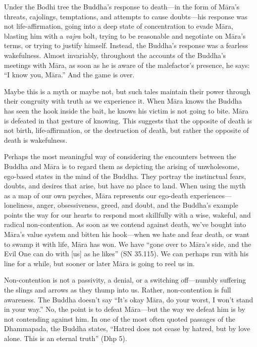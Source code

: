 
Under the Bodhi tree the Buddha's response to death---in the form of 
Māra's threats, cajolings, temptations, and attempts to cause 
doubts---his response was not life-affirmation, going into a deep state 
of concentration to evade Māra, blasting him with a \emph{vajra} bolt, 
trying to be reasonable and negotiate on Māra's terms, or trying to 
justify himself. Instead, the Buddha's response was a fearless 
wakefulness. Almost invariably, throughout the accounts of the Buddha's 
meetings with Māra, as soon as he is aware of the malefactor's 
presence, he says: ``I know you, Māra.'' And the game is over.

Maybe this is a myth or maybe not, but such tales maintain their power 
through their congruity with truth as we experience it. When Māra 
knows the Buddha has seen the hook inside the bait, he knows his victim 
is not going to bite. Māra is defeated in that gesture of knowing. 
This suggests that the opposite of death is not birth, 
life-affirmation, or the destruction of death, but rather the opposite 
of death is wakefulness.

Perhaps the most meaningful way of considering the encounters between 
the Buddha and Māra is to regard them as depicting the arising of 
unwholesome, ego-based states in the mind of the Buddha. They portray 
the instinctual fears, doubts, and desires that arise, but have no 
place to land. When using the myth as a map of our own psyches, Māra 
represents our ego-death experiences---loneliness, anger, 
obsessiveness, greed, and doubt, and the Buddha's example points the 
way for our hearts to respond most skillfully with a wise, wakeful, and 
radical non-contention. As soon as we contend against death, we've 
bought into Māra's value system and bitten his hook---when we hate and 
fear death, or want to swamp it with life, Māra has won. We have 
``gone over to Māra's side, and the Evil One can do with [us] as he 
likes'' (SN 35.115). We can perhaps run with his line for a while, but 
sooner or later Māra is going to reel us in.

Non-contention is not a passivity, a denial, or a switching 
off---numbly suffering the slings and arrows as they thump into us. 
Rather, non-contention is full awareness. The Buddha doesn't say ``It's 
okay Māra, do your worst, I won't stand in your way.'' No, the point 
is to defeat Māra---but the way we defeat him is by not contending 
against him. In one of the most often quoted passages of the 
Dhammapada, the Buddha states, ``Hatred does not cease by hatred, but 
by love alone. This is an eternal truth'' (Dhp 5).

